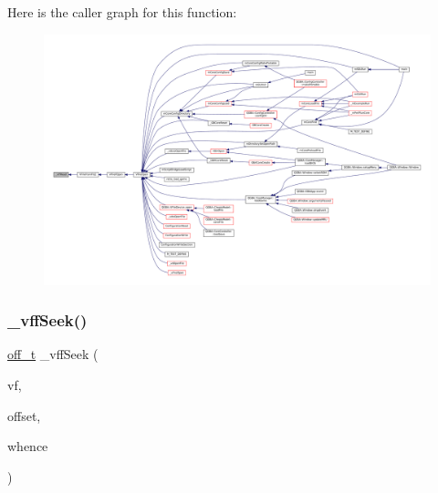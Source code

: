 Here is the caller graph for this function\+:
\nopagebreak
\begin{figure}[H]
\begin{center}
\leavevmode
\includegraphics[width=350pt]{vfs-file_8c_a1d85f044bf97112d5d1ba2f57daba7d3_icgraph}
\end{center}
\end{figure}
\mbox{\label{vfs-file_8c_a178c0916210d9b67414652d0df4b291a}} 
\subsubsection{\texorpdfstring{\+\_\+vff\+Seek()}{\_vffSeek()}}
{\footnotesize\ttfamily \mbox{\hyperlink{__builder_8h_a53066be3c3a28d8b8ccb3dc95c1e49b1}{off\+\_\+t}} \+\_\+vff\+Seek (\begin{DoxyParamCaption}\item[{struct V\+File $\ast$}]{vf,  }\item[{\mbox{\hyperlink{__builder_8h_a53066be3c3a28d8b8ccb3dc95c1e49b1}{off\+\_\+t}}}]{offset,  }\item[{\mbox{\hyperlink{ioapi_8h_a787fa3cf048117ba7123753c1e74fcd6}{int}}}]{whence }\end{DoxyParamCaption})\hspace{0.3cm}{\ttfamily [static]}}

